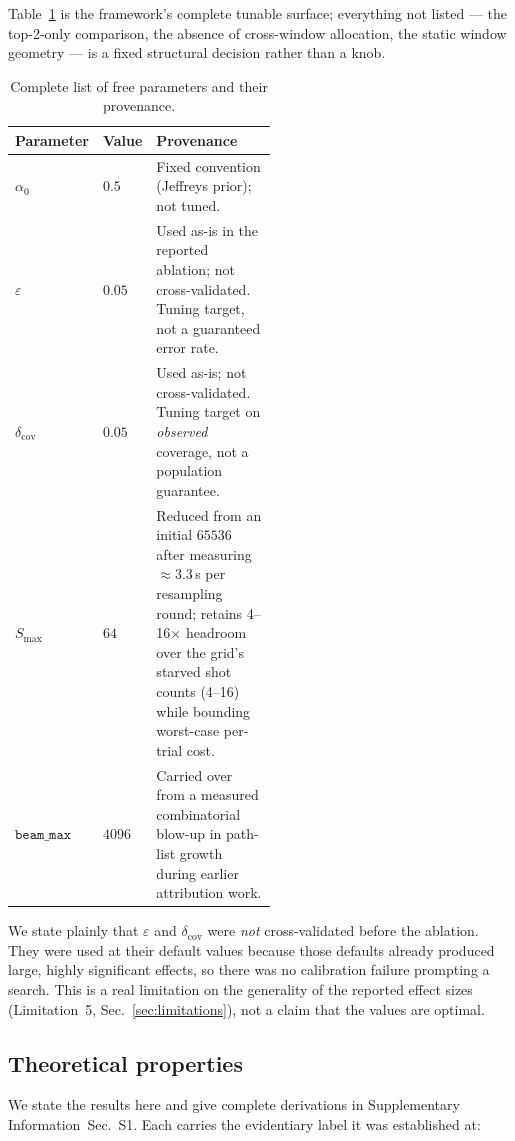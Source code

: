 \documentclass[final,5p,times,longtitle]{elsarticle}
\newcommand{\SI}{Supplementary Information}
\newcommand{\SIproofs}{\SI{}~Sec.~S1}
\newcommand{\dcov}{\delta_{\mathrm{cov}}}
\newcommand{\Smax}{S_{\max}}
\newcommand{\beammax}{\texttt{beam\_max}}
\begin{document}
\label{sec:paramtable}

\noindent
Table~\ref{tab:params} is the framework's complete tunable surface;
everything not listed --- the top-2-only comparison, the absence of
cross-window allocation, the static window geometry --- is a fixed
structural decision rather than a knob.

\begin{table}[htbp]
\centering\small
\caption{Complete list of free parameters and their provenance.}
\label{tab:params}
\begin{tabular}{@{}llp{0.52\linewidth}@{}}
\toprule
Parameter & Value & Provenance \\
\midrule
$\alpha_0$   & $0.5$  & Fixed convention (Jeffreys prior); not tuned. \\
$\varepsilon$& $0.05$ & Used as-is in the reported ablation; not cross-validated. Tuning target, not a guaranteed error rate. \\
$\dcov$      & $0.05$ & Used as-is; not cross-validated. Tuning target on \emph{observed} coverage, not a population guarantee. \\
$\Smax$      & $64$   & Reduced from an initial $65536$ after measuring ${\approx}3.3$\,s per resampling round; retains 4--16$\times$ headroom over the grid's starved shot counts (4--16) while bounding worst-case per-trial cost. \\
$\beammax$   & $4096$ & Carried over from a measured combinatorial blow-up in path-list growth during earlier attribution work. \\
\bottomrule
\end{tabular}
\end{table}

We state plainly that $\varepsilon$ and $\dcov$ were \emph{not}
cross-validated before the ablation. They were used at their default
values because those defaults already produced large, highly significant
effects, so there was no calibration failure prompting a search. This is
a real limitation on the generality of the reported effect sizes
(Limitation~5, Sec.~\ref{sec:limitations}), not a claim that the
values are optimal.

\subsection{Theoretical properties}
\label{sec:properties}

We state the results here and give complete derivations in \SIproofs{}.
Each carries the evidentiary label it was established at:
\end{document}
